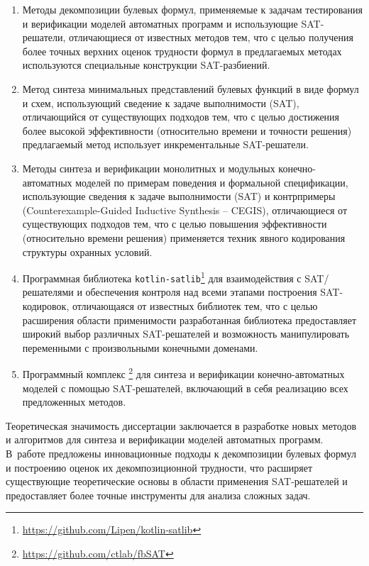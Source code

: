 %
%
\begin{enumerate}[beginpenalty=10000]
    \item Методы декомпозиции булевых формул, применяемые к задачам тестирования и верификации моделей автоматных программ и использующие SAT-решатели, отличающиеся от известных методов тем, что с целью получения более точных верхних оценок трудности формул в предлагаемых методах используются специальные конструкции SAT-разбиений.

    \item Метод синтеза минимальных представлений булевых функций в виде формул и схем, использующий сведение к задаче выполнимости (SAT), отличающийся от существующих подходов тем, что с целью достижения более высокой эффективности (относительно времени и точности решения) предлагаемый метод использует инкрементальные SAT-решатели.

    \item Методы синтеза и верификации монолитных и модульных конечно-автоматных моделей по примерам поведения и формальной спецификации, использующие сведения к задаче выполнимости (SAT) и контрпримеры (Counterexample-Guided Inductive Synthesis \--- CEGIS), отличающиеся от существующих подходов тем, что с целью повышения эффективности (относительно времени решения) применяется техник явного кодирования структуры охранных условий.

    \item Программная библиотека \texttt{kotlin-satlib}\footnote{\url{https://github.com/Lipen/kotlin-satlib}} для взаимодействия с SAT\-/решателями и обеспечения контроля над всеми этапами построения SAT-кодировок, отличающаяся от известных библиотек тем, что с целью расширения области применимости разработанная библиотека предоставляет широкий выбор различных SAT-решателей и возможность манипулировать переменными с произвольными конечными доменами.

    \item Программный комплекс \footnote{\url{https://github.com/ctlab/fbSAT}} для синтеза и верификации конечно-автоматных моделей с помощью SAT-решателей, включающий в себя реализацию всех предложенных методов.
\end{enumerate}


\influence
%
Теоретическая значимость диссертации заключается в разработке новых методов и алгоритмов для синтеза и верификации моделей автоматных программ.
В~работе предложены инновационные подходы к декомпозиции булевых формул и построению оценок их декомпозиционной трудности, что расширяет существующие теоретические основы в области применения SAT-решателей и предоставляет более точные инструменты для анализа сложных задач.

